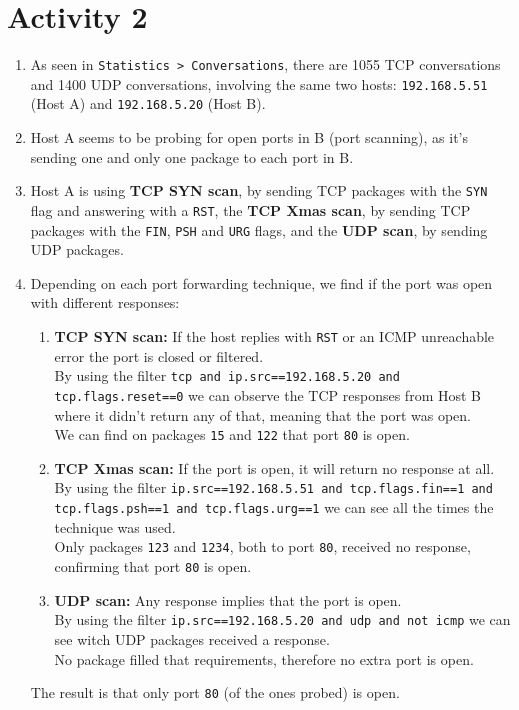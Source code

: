 \section*{Activity 2}
\begin{enumerate}
    \item As seen in \texttt{Statistics > Conversations}, there are 1055 TCP conversations and 1400 UDP conversations, involving the same two hosts: \texttt{192.168.5.51} (Host A) and \texttt{192.168.5.20} (Host B).
    \item Host A seems to be probing for open ports in B (port scanning), as it's sending one and only one package to each port in B.
    \item Host A is using \textbf{TCP SYN scan}, by sending TCP packages with the \texttt{SYN} flag and answering with a \texttt{RST}, the \textbf{TCP Xmas scan}, by sending TCP packages with the \texttt{FIN}, \texttt{PSH} and \texttt{URG} flags, and the \textbf{UDP scan}, by sending UDP packages.
    \item Depending on each port forwarding technique, we find if the port was open with different responses:
    \begin{enumerate}
        \item \textbf{TCP SYN scan:} If the host replies with \texttt{RST} or an ICMP unreachable error the port is closed or filtered.\\
        By using the filter \texttt{tcp and ip.src==192.168.5.20 and tcp.flags.reset==0} we can observe the TCP responses from Host B where it didn't return any of that, meaning that the port was open.\\
        We can find on packages \texttt{15} and \texttt{122} that port \texttt{80} is open.
        \item \textbf{TCP Xmas scan:} If the port is open, it will return no response at all.\\
        By using the filter \texttt{ip.src==192.168.5.51 and tcp.flags.fin==1 and tcp.flags.psh==1 and tcp.flags.urg==1} we can see all the times the technique was used.\\
        Only packages \texttt{123} and \texttt{1234}, both to port \texttt{80}, received no response, confirming that port \texttt{80} is open.
        \item \textbf{UDP scan:} Any response implies that the port is open.\\
        By using the filter \texttt{ip.src==192.168.5.20 and udp and not icmp} we can see witch UDP packages received a response.\\
        No package filled that requirements, therefore no extra port is open.
    \end{enumerate}
    The result is that only port \texttt{80} (of the ones probed) is open.
\end{enumerate}


